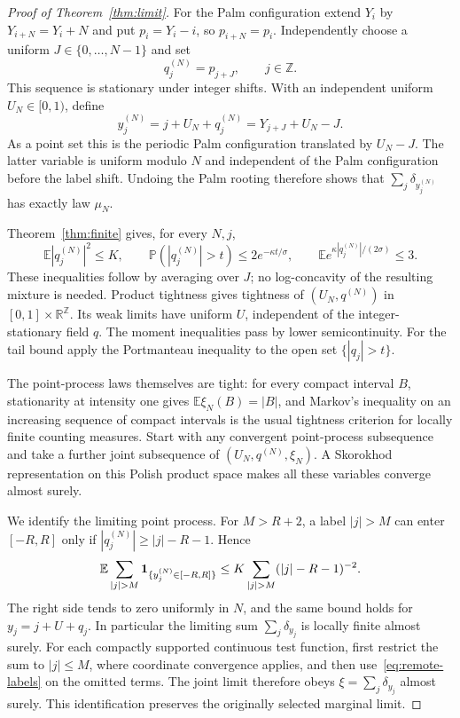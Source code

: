 \documentclass[10pt,a4paper]{amsart}
\newcommand{\E}{\mathbb E}
\newcommand{\Prob}{\mathbb P}
\newcommand{\R}{\mathbb R}
\newcommand{\Z}{\mathbb Z}
\theoremstyle{plain}
\theoremstyle{remark}
\begin{document}
\begin{proof}[Proof of Theorem~\ref{thm:limit}]
For the Palm configuration extend $Y_i$ by $Y_{i+N}=Y_i+N$ and
put $p_i=Y_i-i$, so $p_{i+N}=p_i$. Independently choose a uniform
$J\in\{0,\ldots,N-1\}$ and set
\[
 q_j^{(N)}=p_{j+J},\qquad j\in\Z.
\]
This sequence is stationary under integer shifts. With an independent
uniform $U_N\in[0,1)$, define
\[
 y_j^{(N)}=j+U_N+q_j^{(N)}
          =Y_{j+J}+U_N-J.
\]
As a point set this is the periodic Palm configuration translated by
$U_N-J$. The latter variable is uniform modulo $N$ and independent
of the Palm configuration before the label shift. Undoing the Palm
rooting therefore shows that $\sum_j\delta_{y_j^{(N)}}$ has exactly
law $\mu_N$.

Theorem~\ref{thm:finite} gives, for every $N,j$,
\begin{equation}\label{eq:uniform-q}
 \E|q_j^{(N)}|^2\le K,\qquad
 \Prob(|q_j^{(N)}|>t)\le2e^{-\kappa t/\sigma},\qquad
 \E e^{\kappa|q_j^{(N)}|/(2\sigma)}\le3.
\end{equation}
These inequalities follow by averaging over $J$; no log-concavity
of the resulting mixture is needed. Product tightness gives tightness
of $(U_N,q^{(N)})$ in $[0,1]\times\R^{\Z}$. Its weak limits have
uniform $U$, independent of the integer-stationary field $q$.
The moment inequalities pass by lower semicontinuity. For the tail
bound apply the Portmanteau inequality to the open set
$\{|q_j|>t\}$.

The point-process laws themselves are tight: for every compact
interval $B$, stationarity at intensity one gives
$\E\xi_N(B)=|B|$, and Markov's inequality on an increasing sequence
of compact intervals is the usual tightness criterion for locally
finite counting measures. Start with any convergent point-process
subsequence and take a further joint subsequence of
$(U_N,q^{(N)},\xi_N)$. A Skorokhod representation on this Polish
product space makes all these variables converge almost surely.

We identify the limiting point process. For $M>R+2$, a label
$|j|>M$ can enter $[-R,R]$ only if
$|q_j^{(N)}|\ge |j|-R-1$. Hence
\begin{equation}\label{eq:remote-labels}
 \E\sum_{|j|>M}{\bf1}_{\{y_j^{(N)}\in[-R,R]\}}
 \le K\sum_{|j|>M}(|j|-R-1)^{-2}.
\end{equation}
The right side tends to zero uniformly in $N$, and the same bound
holds for $y_j=j+U+q_j$. In particular the limiting sum
$\sum_j\delta_{y_j}$ is locally finite almost surely. For each
compactly supported continuous test function, first restrict the
sum to $|j|\le M$, where coordinate convergence applies, and then
use~\eqref{eq:remote-labels} on the omitted terms. The joint limit
therefore obeys $\xi=\sum_j\delta_{y_j}$ almost surely. This
identification preserves the originally selected marginal limit.


\end{proof}
\end{document}
